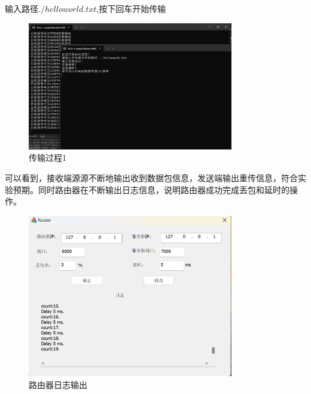 \documentclass[UTF8,a4paper,10pt]{ctexart}
\begin{document}
输入路径$./helloworld.txt$,按下回车开始传输
\begin{figure}[H]
    \centering
\includegraphics[width=0.8\textwidth]{img/传输过程1.png}
    \caption{传输过程1}
\end{figure}
可以看到，接收端源源不断地输出收到数据包信息，发送端输出重传信息，符合实验预期。同时路由器在不断输出日志信息，说明路由器成功完成丢包和延时的操作。
\begin{figure}[H]
    \centering
\includegraphics[width=0.8\textwidth]{img/路由器日志输出.png}
    \caption{路由器日志输出}
\end{figure}
\end{document}
